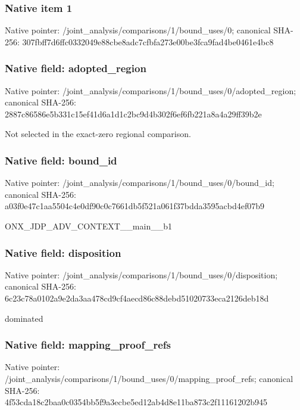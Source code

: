 \documentclass[10pt,a4paper]{article}
\begin{document}
\subsubsection{Native item 1}
Native pointer: /joint\_\allowbreak{}analysis/comparisons/1/bound\_\allowbreak{}uses/0; canonical SHA-256: 307fbff7d6ffc0332049e88cbe8adc7cfbfa273e00be3fca9fad4be0461e4bc8

\subsubsection{Native field: adopted\_\allowbreak{}region}
Native pointer: /joint\_\allowbreak{}analysis/comparisons/1/bound\_\allowbreak{}uses/0/adopted\_\allowbreak{}region; canonical SHA-256: 2887c86586e5b331c15ef41d6a1d1c2bc9d4b302f6ef6fb221a8a4a29ff39b2e

\begingroup\raggedright\sloppy Not selected in the exact-zero regional comparison.\par\endgroup

\subsubsection{Native field: bound\_\allowbreak{}id}
Native pointer: /joint\_\allowbreak{}analysis/comparisons/1/bound\_\allowbreak{}uses/0/bound\_\allowbreak{}id; canonical SHA-256: a03f0e47c1aa5504c4e0df90c0c7661db5f521a061f37bdda3595acbd4ef07b9

\begingroup\raggedright\sloppy ONX\_\allowbreak{}JDP\_\allowbreak{}ADV\_\allowbreak{}CONTEXT\_\allowbreak{}\_\allowbreak{}main\_\allowbreak{}\_\allowbreak{}b1\par\endgroup

\subsubsection{Native field: disposition}
Native pointer: /joint\_\allowbreak{}analysis/comparisons/1/bound\_\allowbreak{}uses/0/disposition; canonical SHA-256: 6c23c78a0102a9e2da3aa478cd9cf4aecd86c88debd51020733eca2126deb18d

\begingroup\raggedright\sloppy dominated\par\endgroup

\subsubsection{Native field: mapping\_\allowbreak{}proof\_\allowbreak{}refs}
Native pointer: /joint\_\allowbreak{}analysis/comparisons/1/bound\_\allowbreak{}uses/0/mapping\_\allowbreak{}proof\_\allowbreak{}refs; canonical SHA-256: 4f53cda18c2baa0c0354bb5f9a3ecbe5ed12ab4d8e11ba873c2f11161202b945
\end{document}
